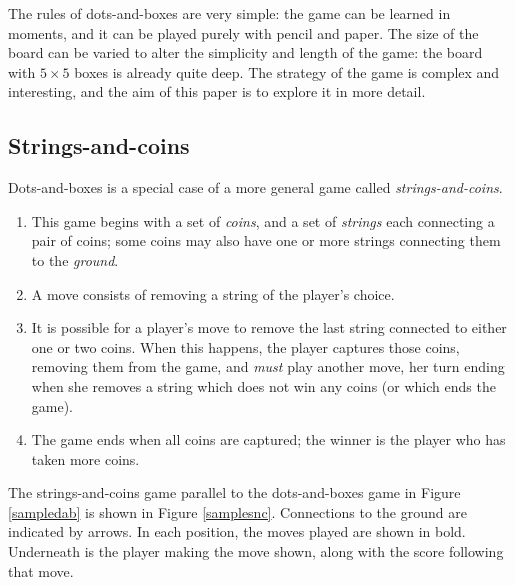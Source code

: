 \documentclass[a4paper,twocolumn]{article}
\begin{document}
\begin{figure*}
  \centering
  \def\svgscale{0.7}
  
  \caption{Sample dots-and-boxes game, which player $A$ wins 3--1}
  \label{sampledab}
\end{figure*}

The rules of dots-and-boxes are very simple: the game can be learned
in moments, and it can be played purely with pencil and paper. The
size of the board can be varied to alter the simplicity and length of
the game: the board with $5 \times 5$ boxes is already quite deep. The
strategy of the game is complex and interesting, and the aim of this
paper is to explore it in more detail.

\subsection{Strings-and-coins}

Dots-and-boxes is a special case of a more general game called
\emph{strings-and-coins}.

\begin{enumerate}
  \item This game begins with a set of \emph{coins}, and a set of
    \emph{strings} each connecting a pair of coins; some coins may
    also have one or more strings connecting them to the
    \emph{ground}.
  \item A move consists of removing a string of the player's choice.
  \item It is possible for a player's move to remove the last string
    connected to either one or two coins. When this happens, the
    player captures those coins, removing them from the game, and
    \emph{must} play another move, her turn ending when she removes a
    string which does not win any coins (or which ends the game).
  \item The game ends when all coins are captured; the winner is the
    player who has taken more coins.
\end{enumerate}

The strings-and-coins game parallel to the dots-and-boxes game in
Figure \ref{sampledab} is shown in Figure \ref{samplesnc}. Connections
to the ground are indicated by arrows. In each position, the moves
played are shown in bold. Underneath is the player making the move
shown, along with the score following that move.

\begin{figure*}
  \centering
  \def\svgscale{0.7}
  
  \caption{Sample strings-and-coins game equivalent to Figure \ref{sampledab}}
  \label{samplesnc}
\end{figure*}
\end{document}
